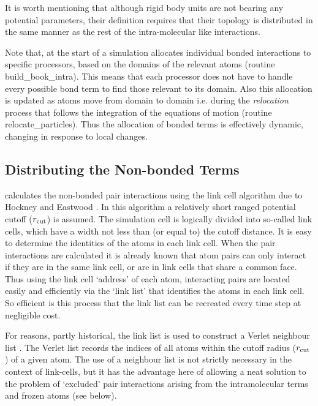 It is worth mentioning that although rigid body
units are not bearing any potential parameters, their definition
requires that their topology is distributed in the same manner as
the rest of the intra-molecular like interactions.

Note that, at the start of a simulation \D allocates individual
bonded interactions to specific processors, based on the domains
of the relevant atoms (\D routine {\sc build\_book\_intra}).
This means that each processor does not have to handle every
possible bond term to find those relevant to its domain.  Also
this allocation is updated as atoms move from domain to domain
i.e. during the {\em relocation} process that follows the
integration of the equations of motion (\D routine {\sc
relocate\_particles}). Thus the allocation of bonded terms is
effectively dynamic, changing in response to local changes.

\subsection{Distributing the Non-bonded Terms}

\D calculates the non-bonded pair
interactions using the link cell algorithm due to Hockney and
Eastwood \cite{hockney-81a}.  In this algorithm a relatively short
ranged potential cutoff ($r_{\rm cut}$) is assumed.  The simulation cell
is logically divided into so-called link cells, which have a width
not less than (or equal to) the cutoff distance.  It is easy to
determine the identities of the atoms in each link cell.  When the
pair interactions are calculated it is already known that atom
pairs can only interact if they are in the same link cell, or are
in link cells that share a common face.  Thus using the link cell
`address' of each atom, interacting pairs are located easily and
efficiently via the `link list' that identifies the atoms in each
link cell.  So efficient is this process that the link list
can be recreated every time step at negligible cost.

For reasons, partly historical, the link list is used to construct
a Verlet neighbour list
\cite{allen-89a}.  The Verlet list records the indices of all
atoms within the cutoff radius ($r_{\rm cut}$) of a given atom.  The
use of a neighbour list is not strictly necessary in the context
of link-cells, but it has the advantage here of allowing a neat
solution to the problem of `excluded' pair interactions arising
from the intramolecular terms and frozen atoms (see below).

